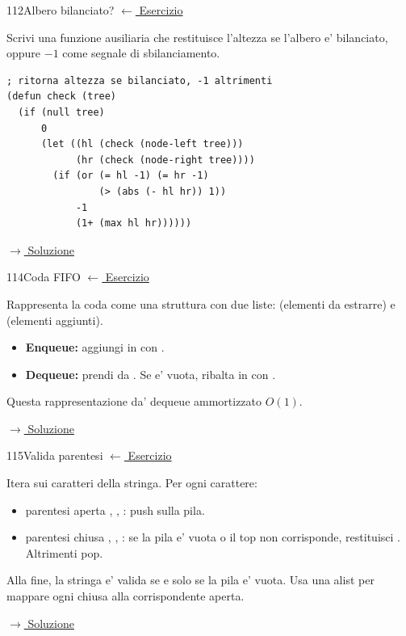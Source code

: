 \label{hint:112}
\begin{hintbox}{112}{Albero bilanciato?}
\small\color{black!55}\hyperref[ex:112]{$\leftarrow$ Esercizio}\normalsize\color{black}

Scrivi una funzione ausiliaria che restituisce l'altezza
se l'albero e' bilanciato, oppure $-1$ come segnale di
sbilanciamento.
\begin{lstlisting}
; ritorna altezza se bilanciato, -1 altrimenti
(defun check (tree)
  (if (null tree)
      0
      (let ((hl (check (node-left tree)))
            (hr (check (node-right tree))))
        (if (or (= hl -1) (= hr -1)
                (> (abs (- hl hr)) 1))
            -1
            (1+ (max hl hr))))))
\end{lstlisting}

\small\color{black!55}\hyperref[sol:112]{$\rightarrow$ Soluzione}\normalsize\color{black}
\end{hintbox}

\label{hint:114}
\begin{hintbox}{114}{Coda FIFO}
\small\color{black!55}\hyperref[ex:114]{$\leftarrow$ Esercizio}\normalsize\color{black}

Rappresenta la coda come una struttura con due liste:
 (elementi da estrarre) e  (elementi aggiunti).
\begin{itemize}[leftmargin=2em]
  \item \textbf{Enqueue:} aggiungi in  con .
  \item \textbf{Dequeue:} prendi da . Se 
        e' vuota, ribalta  in  con .
\end{itemize}
Questa rappresentazione da' dequeue ammortizzato $O(1)$.

\small\color{black!55}\hyperref[sol:114]{$\rightarrow$ Soluzione}\normalsize\color{black}
\end{hintbox}

\label{hint:115}
\begin{hintbox}{115}{Valida parentesi}
\small\color{black!55}\hyperref[ex:115]{$\leftarrow$ Esercizio}\normalsize\color{black}

Itera sui caratteri della stringa. Per ogni carattere:
\begin{itemize}[leftmargin=2em]
  \item parentesi aperta \fn{(}, \fn{[}, \fn{\{}: push sulla pila.
  \item parentesi chiusa \fn{)}, \fn{]}, \fn{\}}: se la pila
        e' vuota o il top non corrisponde, restituisci .
        Altrimenti pop.
\end{itemize}
Alla fine, la stringa e' valida se e solo se la pila e' vuota.
Usa una alist per mappare ogni chiusa alla corrispondente aperta.

\small\color{black!55}\hyperref[sol:115]{$\rightarrow$ Soluzione}\normalsize\color{black}
\end{hintbox}

